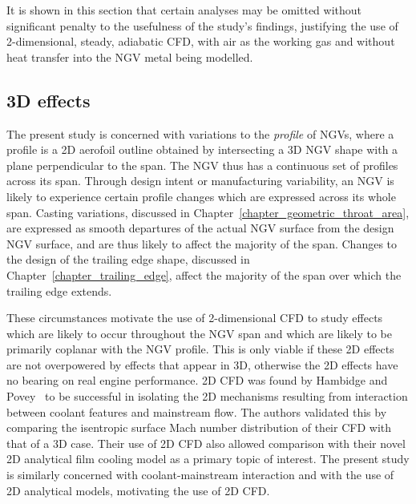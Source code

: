 \documentclass[a4paper, 11pt, oneside]{report}
\begin{document}
It is shown in this section that certain analyses may be omitted without significant penalty to the usefulness of the study's findings, justifying the use of 2-dimensional, steady, adiabatic CFD, with air as the working gas and without heat transfer into the NGV metal being modelled.

\subsection{3D effects}

The present study is concerned with variations to the \textit{profile} of NGVs, where a profile is a 2D aerofoil outline obtained by intersecting a 3D NGV shape with a plane perpendicular to the span. The NGV thus has a continuous set of profiles across its span. Through design intent or manufacturing variability, an NGV is likely to experience certain profile changes which are expressed across its whole span. Casting variations, discussed in Chapter~\ref{chapter_geometric_throat_area}, are expressed as smooth departures of the actual NGV surface from the design NGV surface, and are thus likely to affect the majority of the span. Changes to the design of the trailing edge shape, discussed in Chapter~\ref{chapter_trailing_edge}, affect the majority of the span over which the trailing edge extends.

These circumstances motivate the use of 2-dimensional CFD to study effects which are likely to occur throughout the NGV span and which are likely to be primarily coplanar with the NGV profile. This is only viable if these 2D effects are not overpowered by effects that appear in 3D, otherwise the 2D effects have no bearing on real engine performance. 2D CFD was found by Hambidge and Povey~\cite{hambidge_film_cooling} to be successful in isolating the 2D mechanisms resulting from interaction between coolant features and mainstream flow. The authors validated this by comparing the isentropic surface Mach number distribution of their CFD with that of a 3D case. Their use of 2D CFD also allowed comparison with their novel 2D analytical film cooling model as a primary topic of interest. The present study is similarly concerned with coolant-mainstream interaction and with the use of 2D analytical models, motivating the use of 2D CFD.
\end{document}
